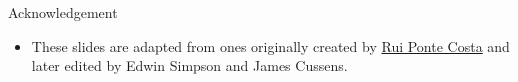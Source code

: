 \documentclass[10pt]{beamer}
\begin{document}

\begin{frame}
  \titlepage
\end{frame}
\begin{titledslide}{Acknowledgement}

  \begin{itemize}
  \item These slides are adapted from ones originally created by
    \href{https://www.dpag.ox.ac.uk/team/rui-ponte-costa}{Rui Ponte
      Costa} and later edited by Edwin Simpson and James Cussens. 
  \end{itemize}
  
\end{titledslide}
\end{document}

